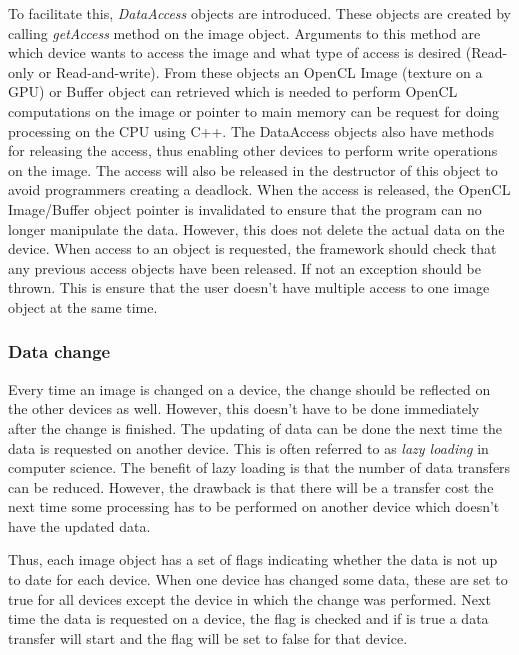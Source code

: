 \documentclass{article}
\begin{document}
To facilitate this, \textit{DataAccess} objects are introduced.
These objects are created by calling \textit{getAccess} method on the image object.
Arguments to this method are which device wants to access the image and what type of access is desired (Read-only or Read-and-write).
From these objects an OpenCL Image (texture on a GPU) or Buffer object can retrieved which is needed to perform OpenCL computations on the image or pointer to main memory can be request for doing processing on the CPU using C++.
The DataAccess objects also have methods for releasing the access, thus enabling other devices to perform write operations on the image.
The access will also be released in the destructor of this object to avoid programmers creating a deadlock.
When the access is released, the OpenCL Image/Buffer object pointer is invalidated to ensure that the program can no longer manipulate the data.
However, this does not delete the actual data on the device.
When access to an object is requested, the framework should check that any previous access objects have been released.
If not an exception should be thrown.
This is ensure that the user doesn't have multiple access to one image object at the same time.

\subsubsection{Data change}

Every time an image is changed on a device, the change should be reflected on the other devices as well.
However, this doesn't have to be done immediately after the change is finished.
The updating of data can be done the next time the data is requested on another device.
This is often referred to as \textit{lazy loading} in computer science.
The benefit of lazy loading is that the number of data transfers can be reduced.
However, the drawback is that there will be a transfer cost the next time some processing has to be performed on another device which doesn't have the updated data.

Thus, each image object has a set of flags indicating whether the data is not up to date for each device.
When one device has changed some data, these are set to true for all devices except the device in which the change was performed.
Next time the data is requested on a device, the flag is checked and if is true a data transfer will start and the flag will be set to false for that device.

\end{document}
